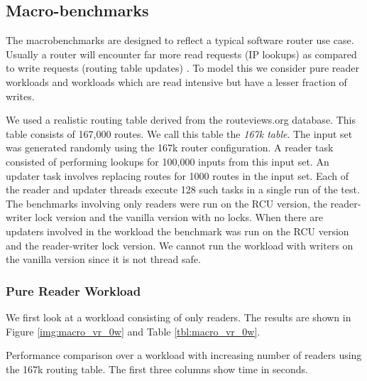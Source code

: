 \documentclass{article}
\begin{document}
\subsection{Macro-benchmarks}
\label{sec:macrobenchmarks}

The macrobenchmarks are designed to reflect a typical software router
use case. Usually a router will encounter far more read requests (IP
lookups) as compared to write requests (routing table updates) . To
model this we consider pure reader workloads and workloads which are
read intensive but have a lesser fraction of writes.

We used a realistic routing table derived from the routeviews.org
database. This table consists of 167,000 routes. We call this table
the \emph{167k table}. The input set was generated randomly using the
167k router configuration. A reader task consisted of performing
lookups for 100,000 inputs from this input set. An updater task
involves replacing routes for 1000 routes in the input set. Each of
the reader and updater threads execute 128 such tasks in a single run
of the test.\\

The benchmarks involving only readers were run on the RCU version,
the reader-writer lock version and the vanilla version with no
locks. When there are updaters involved in the workload the benchmark
was run on the RCU version and the reader-writer lock version. We
cannot run the workload with writers on the vanilla version since it
is not thread safe. 

\subsubsection{Pure Reader Workload}
 We first look at a workload consisting of only readers. The results
 are shown in Figure \ref{img:macro_vr_0w} and Table
 \ref{tbl:macro_vr_0w}.\\

\begin{table}[tph]
\begin{center}

\end{center}
\caption{Performance comparison over a workload with increasing number of readers using the 167k routing table. The first three columns show time in seconds.}
\label{tbl:macro_vr_0w}
\end{table}
\end{document}
